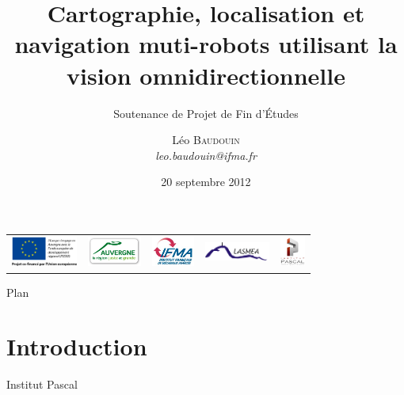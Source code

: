 \documentclass{beamer}
\title{Cartographie, localisation et navigation muti-robots utilisant la vision omnidirectionnelle}
\subtitle{Soutenance de Projet de Fin d'\'Etudes}
\author{L\'eo \textsc{Baudouin}\\\emph{leo.baudouin@ifma.fr}}
\institute{
Institut Pascal (LASMEA)
}
\date{20 septembre 2012}
\begin{document}
\begin{frame}
\titlepage
\begin{tabular}{c c c c c}
    \begin{minipage}{0.2\linewidth}
      \includegraphics[height=10mm]{images/EU.jpg}
    \end{minipage}
    &
    \begin{minipage}{0.2\linewidth}
      \includegraphics[height=10mm]{images/auvergne.png}
    \end{minipage}
    &
    \begin{minipage}{0.12\linewidth}
      \includegraphics[height=10mm]{images/logo-IFMA.jpg}
    \end{minipage}
    &
    \begin{minipage}{0.2\linewidth}
      \includegraphics[height=6mm]{images/logo-LASMEA}
    \end{minipage}
    &
    \begin{minipage}{0.2\linewidth}
      \includegraphics[height=10mm]{images/logo-IP}
    \end{minipage}
  \end{tabular}
\end{frame}


\begin{frame}{Plan}
\tableofcontents
\end{frame}

\section{Introduction}
\begin{frame}{Institut Pascal}

\end{frame}
\end{document}
